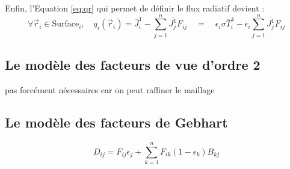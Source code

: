 Enfin, l'Equation \ref{eq:qr} qui permet de définir le flux radiatif devient :
\begin{equation}
    \forall \vec{r}_i \in \text{Surface}_i,\quad q_i(\vec{r}_i) =  \overline{J}_i^1  -  \sum_{j=1}^{n} \overline{J_j^1} F_{ij} \quad = \quad \epsilon_i \sigma \overline{T}^4_i  - \epsilon_i \sum_{j=1}^{n} \overline{J_j^1} F_{ij}
    \label{eq:nice_qr}
\end{equation}

\subsection{Le modèle des facteurs de vue d'ordre 2}
pas forcément nécessaires car on peut raffiner le maillage

\subsection{Le modèle des facteurs de Gebhart}

\begin{equation}
D_{ij} = F_{ij} \epsilon_j + \sum_{k=1}^n F_{ik} (1 - \epsilon_k) B_{kj}
\end{equation}



